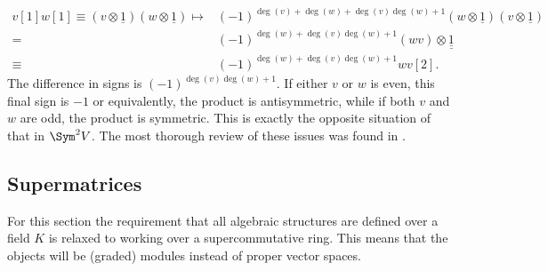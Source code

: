 \begin{remark}
        \begin{align*}
            v[1]w[1]\equiv(v\otimes\underline{1})(w\otimes\underline{1})\mapsto&(-1)^{\deg(v)+\deg(w)+\deg(v)\deg(w)+1}(w\otimes\underline{1})(v\otimes\underline{1})\\
            =&(-1)^{\deg(w)+\deg(v)\deg(w)+1}(wv)\otimes\underline{\underline{1}}\\
            \equiv&(-1)^{\deg(w)+\deg(v)\deg(w)+1}wv[2].
        \end{align*}
        The difference in signs is $(-1)^{\deg(v)\deg(w)+1}$. If either $v$ or $w$ is even, this final sign is $-1$ or equivalently, the product is antisymmetric, while if both $v$ and $w$ are odd, the product is symmetric. This is exactly the opposite situation of that in $\Sym^2V$. The most thorough review of these issues was found in \cite{MitiAntonioMichele2021Hcmi}.
    \end{remark}

\subsection{Supermatrices}

    For this section the requirement that all algebraic structures are defined over a field $K$ is relaxed to working over a supercommutative ring. This means that the objects will be (graded) modules instead of proper vector spaces.


